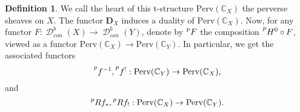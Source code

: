 \documentclass[letterpaper, 12pt]{article}
\newcommand{\C}{\mathbb{C}}
\DeclareMathOperator{\D}{\mathcal{D}}
\theoremstyle{definition}
\newtheorem{definition}{Definition}
\theoremstyle{remark}
\newcommand{\F}{\mathscr{F}}
\newcommand{\sH}{\mathscr{H}}
\begin{document}
\begin{definition}
    We call the heart of this t-structure $\text{Perv}(\C_X)$ the perverse sheaves on $X$. The functor $\mathbf{D}_X$ induces a duality of $\text{Perv}(\C_X)$.
    Now, for any functor $F: \D^b_{con}(X) \to \D^b_{con}(Y)$,
    denote by $\prescript{p}{}{F}$ the composition $\prescript{p}{}{H^0} \circ F$, viewed as a functor $\text{Perv}(\C_X) \to \text{Perv}(\C_Y)$.
    In particular, we get the associated functors
    \begin{equation*}
        \prescript{p}{}{f^{-1}},  \prescript{p}{}{f^{!}}: 
        \text{Perv}(\C_Y) \to \text{Perv}(\C_X),
    \end{equation*}
    and
    \begin{equation*}
        \prescript{p}{}{Rf_*}, \prescript{p}{}{Rf_!}:
        \text{Perv}(\C_X) \to \text{Perv}(\C_Y).
    \end{equation*}
\end{definition}





\end{document}
